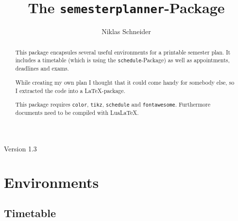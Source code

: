 \documentclass[english]{article}
\title{The \texttt{semesterplanner}-Package}
\author{Niklas Schneider}
\begin{document}
	\maketitle
	\begin{center}
		Version 1.3\\
	\end{center}

	\begin{abstract}
		This package encapsules several useful environments for a printable semester plan. It includes a timetable (which is using the \texttt{schedule}-Package) as well as appointments, deadlines and exams.
		
		While creating my own plan I thought that it could come handy for somebody else, so I extracted the code into a \LaTeX-package.
		
		This package requires \texttt{color}, \texttt{tikz}, \texttt{schedule} and \texttt{fontawesome}. Furthermore documents need to be compiled with LuaLaTeX.
	\end{abstract}

	\tableofcontents
	\pagebreak
	
	\section{Environments}
	\subsection{Timetable}
	\label{timetable}
\end{document}
